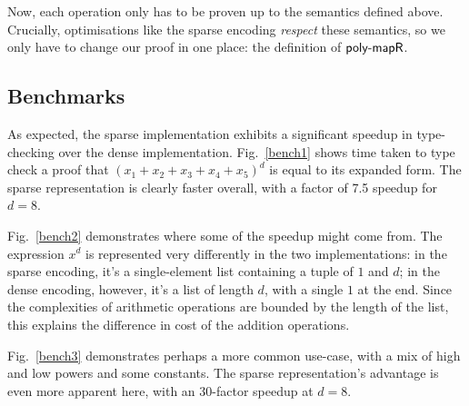 \documentclass[acmsmall,review,anonymous]{acmart}\settopmatter{printfolios=true,printccs=false,printacmref=false}
\theoremstyle{remark}
\begin{document}
\begin{center}
\end{center}

Now, each operation only has to be proven up to the semantics defined above.
Crucially, optimisations like the sparse encoding \emph{respect} these
semantics, so we only have to change our proof in one place: the definition of
\(\AgdaFunction{poly-mapR}\).
\subsection{Benchmarks}
As expected, the sparse implementation exhibits a significant speedup in
type-checking over the dense implementation. Fig.~\ref{bench1}
shows time taken to type check a proof that \((x_1 + x_2 + x_3 + x_4 + x_5)^d\)
is equal to its expanded form. The sparse representation is clearly faster
overall, with a factor of 7.5 speedup for \(d = 8\).

Fig.~\ref{bench2} demonstrates where some of the speedup might come
from. The expression \(x^d\) is represented very differently in the two
implementations: in the sparse encoding, it's a single-element list containing a
tuple of $1$ and $d$; in the dense encoding, however, it's a list of length $d$,
with a single $1$ at the end. Since the complexities of arithmetic operations
are bounded by the length of the list, this explains the difference in cost of
the addition operations.

Fig.~\ref{bench3} demonstrates perhaps a more common use-case, with a mix of
high and low powers and some constants. The sparse representation's advantage is
even more apparent here, with an \(30\)-factor speedup at \(d = 8\).
\end{document}
